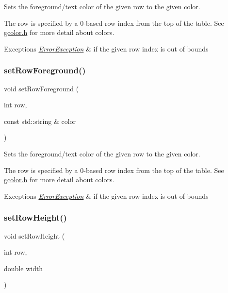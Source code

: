 Sets the foreground/text color of the given row to the given color. 

The row is specified by a 0-\/based row index from the top of the table. See \mbox{\hyperlink{gcolor_8h_source}{gcolor.\+h}} for more detail about colors. 
\begin{DoxyExceptions}{Exceptions}
{\em \mbox{\hyperlink{classErrorException}{Error\+Exception}}} & if the given row index is out of bounds \\
\hline
\end{DoxyExceptions}
\mbox{\label{classGTable_a27ede8127bd8889e3f71dfe152c1684d}} 
\subsubsection{\texorpdfstring{set\+Row\+Foreground()}{setRowForeground()}\hspace{0.1cm}{\footnotesize\ttfamily [2/2]}}
{\footnotesize\ttfamily void set\+Row\+Foreground (\begin{DoxyParamCaption}\item[{int}]{row,  }\item[{const std\+::string \&}]{color }\end{DoxyParamCaption})\hspace{0.3cm}{\ttfamily [virtual]}}



Sets the foreground/text color of the given row to the given color. 

The row is specified by a 0-\/based row index from the top of the table. See \mbox{\hyperlink{gcolor_8h_source}{gcolor.\+h}} for more detail about colors. 
\begin{DoxyExceptions}{Exceptions}
{\em \mbox{\hyperlink{classErrorException}{Error\+Exception}}} & if the given row index is out of bounds \\
\hline
\end{DoxyExceptions}
\mbox{\label{classGTable_a815f0bed3e7a76d99b4a026808a555b3}} 
\subsubsection{\texorpdfstring{set\+Row\+Height()}{setRowHeight()}}
{\footnotesize\ttfamily void set\+Row\+Height (\begin{DoxyParamCaption}\item[{int}]{row,  }\item[{double}]{width }\end{DoxyParamCaption})\hspace{0.3cm}{\ttfamily [virtual]}}



